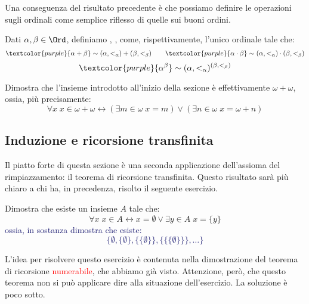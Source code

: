 \documentclass[11pt]{scrartcl}
\begin{document}
Una conseguenza del risultato precedente è che possiamo definire le operazioni sugli ordinali come semplice riflesso di quelle sui buoni ordini.

\begin{definition}
	Dati $\alpha,\beta \in\Ord$, definiamo \vocab{$\alpha + \beta$}, \vocab{$\alpha\cdot\beta$}, \vocab{$\alpha^\beta$} come, rispettivamente, l'unico ordinale tale che:
	\[ \textcolor{purple}{\alpha + \beta} \sim (\alpha,<_\alpha)+(\beta,<_\beta) \qquad \textcolor{purple}{\alpha \cdot \beta} \sim (\alpha,<_\alpha) \cdot (\beta,<_\beta)
		\]\[ \textcolor{purple}{\alpha^\beta} \sim (\alpha,<_\alpha)^{(\beta,<_\beta)}
			\]
\end{definition}

\begin{exercise}
	Dimostra che l'insieme introdotto all'inizio della sezione è effettivamente $\omega + \omega$, ossia, più precisamente:
	\[ \forall x \; x \in \omega + \omega \leftrightarrow (\exists m \in \omega \; x = m) \lor (\exists n \in \omega \; x = \omega +n)
		\]
\end{exercise}

\subsection{Induzione e ricorsione transfinita}
Il piatto forte di questa sezione è una seconda applicazione dell'assioma del rimpiazzamento: il teorema di ricorsione transfinita. Questo risultato sarà più chiaro a chi ha, in precedenza, risolto il seguente esercizio.

\begin{exercise}
	Dimostra che esiste un insieme $A$ tale che:
	\[ \forall x \; x \in A \leftrightarrow x = \emptyset \lor \exists y \in A \; x = \{y\}
		\]
	\textcolor{MidnightBlue}{ossia, in sostanza dimostra che esiste:
	\[ \{\emptyset,\{\emptyset\},\{\{\emptyset\}\},\{\{\{\emptyset\}\}\},\ldots\}
		\]}
\end{exercise}

L'idea per risolvere questo esercizio è contenuta nella dimostrazione del teorema di ricorsione \textcolor{red}{numerabile}, che abbiamo già visto. Attenzione, però,
che questo teorema non si può applicare dire alla situazione dell'esercizio. La soluzione è poco sotto.

\begin{soln}
	
\end{soln}
\end{document}
